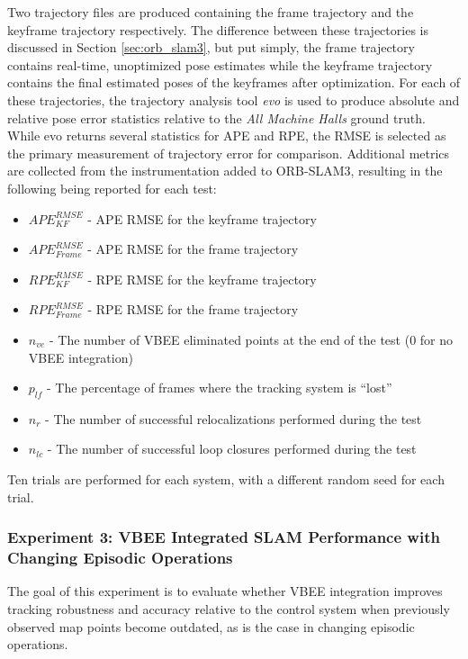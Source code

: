 Two trajectory files are produced containing the frame trajectory and the keyframe trajectory respectively. The difference between these trajectories is discussed in Section \ref{sec:orb_slam3}, but put simply, the frame trajectory contains real-time, unoptimized pose estimates while the keyframe trajectory contains the final estimated poses of the keyframes after optimization. For each of these trajectories, the trajectory analysis tool \textit{evo} is used to produce absolute and relative pose error statistics relative to the \textit{All Machine Halls} ground truth. While evo returns several statistics for APE and RPE, the RMSE is selected as the primary measurement of trajectory error for comparison. Additional metrics are collected from the instrumentation added to ORB-SLAM3, resulting in the following being reported for each test:
\begin{itemize}
    \item $APE^{RMSE}_{KF}$ - APE RMSE for the keyframe trajectory
    \item $APE^{RMSE}_{Frame}$ - APE RMSE for the frame trajectory
    \item $RPE^{RMSE}_{KF}$ - RPE RMSE for the keyframe trajectory
    \item $RPE^{RMSE}_{Frame}$ - RPE RMSE for the frame trajectory
    \item $n_{ve}$ - The number of VBEE eliminated points at the end of the test (0 for no VBEE integration)
    \item $p_{lf}$ - The percentage of frames where the tracking system is ``lost''
    \item $n_{r}$ - The number of successful relocalizations performed during the test
    \item $n_{lc}$ - The number of successful loop closures performed during the test
\end{itemize}

Ten trials are performed for each system, with a different random seed for each trial.

\subsubsection*{Experiment 3: VBEE Integrated SLAM Performance with Changing Episodic Operations}
The goal of this experiment is to evaluate whether VBEE integration improves tracking robustness and accuracy relative to the control system when previously observed map points become outdated, as is the case in changing episodic operations.

